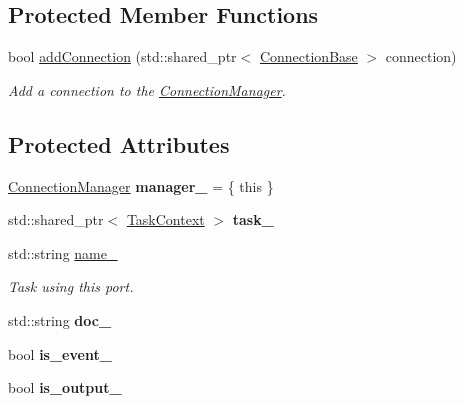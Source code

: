 \subsection*{Protected Member Functions}
\begin{DoxyCompactItemize}
\item 
\hypertarget{classcoco_1_1_port_base_afa50a47a0608471a7e182c5f848193ca}{}bool \hyperlink{classcoco_1_1_port_base_afa50a47a0608471a7e182c5f848193ca}{add\+Connection} (std\+::shared\+\_\+ptr$<$ \hyperlink{classcoco_1_1_connection_base}{Connection\+Base} $>$ connection)\label{classcoco_1_1_port_base_afa50a47a0608471a7e182c5f848193ca}

\begin{DoxyCompactList}\small\item\em Add a connection to the \hyperlink{classcoco_1_1_connection_manager}{Connection\+Manager}. \end{DoxyCompactList}\end{DoxyCompactItemize}
\subsection*{Protected Attributes}
\begin{DoxyCompactItemize}
\item 
\hypertarget{classcoco_1_1_port_base_a33f04beb590390a25bfdcf300bffb70e}{}\hyperlink{classcoco_1_1_connection_manager}{Connection\+Manager} {\bfseries manager\+\_\+} = \{ this \}\label{classcoco_1_1_port_base_a33f04beb590390a25bfdcf300bffb70e}

\item 
\hypertarget{classcoco_1_1_port_base_af6fede884062c2b3a774ed69da5c0291}{}std\+::shared\+\_\+ptr$<$ \hyperlink{classcoco_1_1_task_context}{Task\+Context} $>$ {\bfseries task\+\_\+}\label{classcoco_1_1_port_base_af6fede884062c2b3a774ed69da5c0291}

\item 
\hypertarget{classcoco_1_1_port_base_a3ca4d9d5dcd73da483b176fdd45cb837}{}std\+::string \hyperlink{classcoco_1_1_port_base_a3ca4d9d5dcd73da483b176fdd45cb837}{name\+\_\+}\label{classcoco_1_1_port_base_a3ca4d9d5dcd73da483b176fdd45cb837}

\begin{DoxyCompactList}\small\item\em Task using this port. \end{DoxyCompactList}\item 
\hypertarget{classcoco_1_1_port_base_ab821e90d50ec2c6f8c1edde95272719c}{}std\+::string {\bfseries doc\+\_\+}\label{classcoco_1_1_port_base_ab821e90d50ec2c6f8c1edde95272719c}

\item 
\hypertarget{classcoco_1_1_port_base_a3bda6ce2261f36704a7f30dfed297426}{}bool {\bfseries is\+\_\+event\+\_\+}\label{classcoco_1_1_port_base_a3bda6ce2261f36704a7f30dfed297426}

\item 
\hypertarget{classcoco_1_1_port_base_a6119b0d7b6bb1eabf085afb7f3bc149f}{}bool {\bfseries is\+\_\+output\+\_\+}\label{classcoco_1_1_port_base_a6119b0d7b6bb1eabf085afb7f3bc149f}

\end{DoxyCompactItemize}
